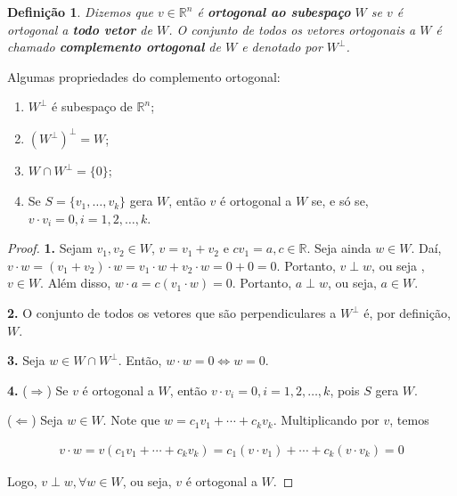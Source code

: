 \documentclass{article}
\newtheorem*{definition}{Definição}
\begin{document}
\begin{definition}
	Dizemos que $v\in\mathbb{R}^n$ é \textbf{ortogonal ao subespaço} $W$ se $v$ é ortogonal a \textbf{todo vetor} de $W$. O conjunto de todos os vetores ortogonais a $W$ é chamado \textbf{complemento ortogonal} de $W$ e denotado por $W^{\perp}$. 
\end{definition}

\par\vspace{0.3cm} Algumas propriedades do complemento ortogonal:
\begin{enumerate}
	\item $W^{\perp}$ é subespaço de $\mathbb{R}^n$;
	\item $(W^{\perp})^{\perp} = W$;
	\item $W\cap W^{\perp} = \{0\}$;
	\item Se $S = \{ v_1, \dots, v_k \}$ gera $W$, então $v$ é ortogonal a $W$ se, e só se, $v\cdot v_i = 0, i=1, 2, \dots, k$.
\end{enumerate}

\begin{proof}
	\textbf{1.} Sejam $v_1, v_2\in W$, $v = v_1 + v_2$ e $cv_1 = a, c\in\mathbb{R}$. Seja ainda $w\in W$. Daí, $v\cdot w = (v_1 + v_2)\cdot w = v_1\cdot w + v_2\cdot w = 0+0 = 0$. Portanto, $v\perp w$, ou seja ,$v\in W$. Além disso, $w\cdot a = c(v_1\cdot w) = 0$. Portanto, $a\perp w$, ou seja, $a\in W$.
	
	\par\vspace{0.4cm}\hspace{16pt}\textbf{2.} O conjunto de todos os vetores que são perpendiculares a $W^{\perp}$ é, por definição, $W$.
	
	\par\vspace{0.4cm}\hspace{16pt}\textbf{3.} Seja $w\in W\cap W^{\perp}$. Então, $w\cdot w = 0 \Leftrightarrow w = 0$.
	
	\par\vspace{0.4cm}\hspace{16pt}\textbf{4.} ($\Rightarrow$) Se $v$ é ortogonal a $W$, então $v\cdot v_i = 0, i=1, 2, \dots, k$, pois $S$ gera $W$.
	\par\hspace{30pt}($\Leftarrow$) Seja $w\in W$. Note que $w = c_1v_1 + \cdots + c_kv_k$. Multiplicando por $v$, temos 
	
	\begin{align*}
	v\cdot w = v(c_1v_1 + \cdots + c_kv_k) = c_1(v\cdot v_1) + \cdots + c_k(v\cdot v_k) = 0
	\end{align*}
	
	\par\vspace{0.3cm} Logo, $v\perp w, \forall w\in W$, ou seja, $v$ é ortogonal a $W$.
	
\end{proof}
\end{document}
